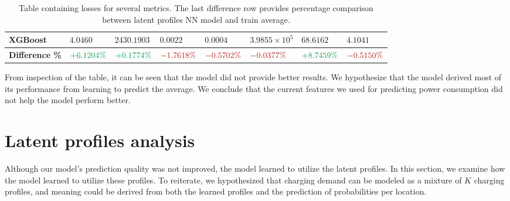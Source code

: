 \begin{table*}[h!]
\begin{tabular}{p{3cm} p{1.5cm} p{2cm} p{1.3cm} p{1.3cm} p{2cm} p{1.6cm} p{1.6cm}}
        XGBoost                      & $4.0460$                             & $2430.1903$                          & $0.0022$                          & $0.0004$                          & $3.9855\times10^{5}$              & $68.6162$                            & $4.1041$                          \\

        \midrule

        \textbf{Difference \%}       & $\textcolor{ForestGreen}{+6.1204\%}$ & $\textcolor{ForestGreen}{+0.1774\%}$ & $\textcolor{BrickRed}{-1.7618\%}$ & $\textcolor{BrickRed}{-0.5702\%}$ & $\textcolor{BrickRed}{-0.0377\%}$ & $\textcolor{ForestGreen}{+8.7459\%}$ & $\textcolor{BrickRed}{-0.5150\%}$ \\

        \bottomrule
    \end{tabular}
    \caption{Table containing losses for several metrics. The last difference row provides percentage comparison between latent profiles NN model and train average.}
    \label{tab:losses-table}
\end{table*}

From inspection of the table, it can be seen that the model did not provide better results. We hypothesize that the model derived most of its performance from learning to predict the average. We conclude that the current features we used for predicting power consumption did not help the model perform better.


\section{Latent profiles analysis}

Although our model's prediction quality was not improved, the model learned to utilize the latent profiles. In this section, we examine how the model learned to utilize these profiles. To reiterate, we hypothesized that charging demand can be modeled as a mixture of $K$ charging profiles, and meaning could be derived from both the learned profiles and the prediction of probabilities per location.

